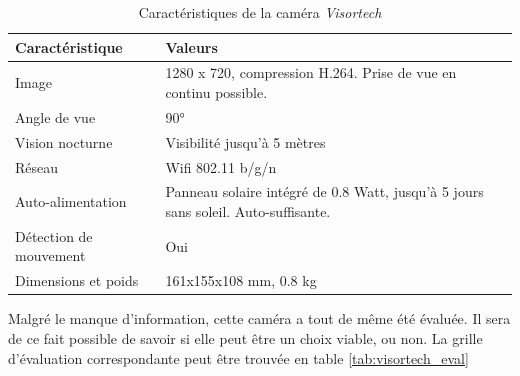 \begin{table}[H]
    \centering
    \caption{Caractéristiques de la caméra \textit{Visortech}}
    \label{tab:visortech_spec}
    \begin{tabular}{@{}lp{10cm}@{}}
    \toprule
    Caractéristique        & Valeurs                                                          \\ \midrule
    Image                  & 1280 x 720, compression H.264. Prise de vue en continu possible. \\ [0.8ex]
    Angle de vue           & 90°                                                              \\ [0.8ex]
    Vision nocturne         & Visibilité jusqu'à 5 mètres                                      \\ [0.8ex]
    Réseau                 & Wifi 802.11 b/g/n                                                \\ [0.8ex]
    Auto-alimentation      & Panneau solaire intégré de 0.8 Watt, jusqu'à 5 jours sans soleil. Auto-suffisante.     \\ [0.8ex]
    Détection de mouvement & Oui                                                              \\ [0.8ex]
    Dimensions et poids    & 161x155x108 mm, 0.8 kg                                            \\  [0.8ex]\bottomrule
    \end{tabular}
\end{table}

Malgré le manque d'information, cette caméra a tout de même été évaluée. Il sera de ce fait possible de savoir si elle peut être un choix viable, ou non. La grille d'évaluation correspondante peut être trouvée en table \ref{tab:visortech_eval}

